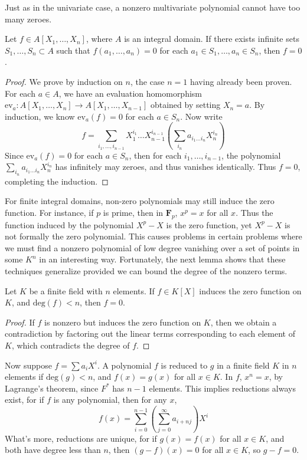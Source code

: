 Just as in the univariate case, a nonzero multivariate polynomial cannot have too many zeroes.

\begin{corollary}
    Let $f \in A[X_1, \dots, X_n]$, where $A$ is an integral domain. If there exists infinite sets $S_1, \dots, S_n \subset A$ such that $f(a_1, \dots, a_n) = 0$ for each $a_1 \in S_1, \dots, a_n \in S_n$, then $f = 0$.
\end{corollary}
\begin{proof}
    We prove by induction on $n$, the case $n = 1$ having already been proven. For each $a \in A$, we have an evaluation homomorphism $\text{ev}_a: A[X_1, \dots, X_n] \to A[X_1, \dots, X_{n-1}]$ obtained by setting $X_n = a$. By induction, we know $\text{ev}_a(f) = 0$ for each $a \in S_n$. Now write
    \[ f = \sum_{i_1, \dots, i_{n-1}} X_1^{i_1} \dots X_{n-1}^{i_{n-1}} \left( \sum_{i_n} a_{i_1 \dots i_n} X_n^{i_n} \right) \]
    Since $\text{ev}_a(f) = 0$ for each $a \in S_n$, then for each $i_1, \dots, i_{n-1}$, the polynomial $\sum_{i_n} a_{i_1 \dots i_n} X_n^{i_n}$ has infinitely may zeroes, and thus vanishes identically. Thus $f = 0$, completing the induction.
\end{proof}

For finite integral domains, non-zero polynomials may still induce the zero function. For instance, if $p$ is prime, then in $\mathbf{F}_p$, $x^p = x$ for all $x$. Thus the function induced by the polynomial $X^p - X$ is the zero function, yet $X^p - X$ is not formally the zero polynomial. This causes problems in certain problems where we must find a nonzero polynomial of low degree vanishing over a set of points in some $K^n$ in an interesting way. Fortunately, the next lemma shows that these techniques generalize provided we can bound the degree of the nonzero terms.

\begin{lemma}
    Let $K$ be a finite field with $n$ elements. If $f \in K[X]$ induces the zero function on $K$, and $\text{deg}(f) < n$, then $f = 0$.
\end{lemma}
\begin{proof}
	If $f$ is nonzero but induces the zero function on $K$, then we obtain a contradiction by factoring out the linear terms corresponding to each element of $K$, which contradicts the degree of $f$.
\end{proof}

Now suppose $f = \sum a_i X^i$. A polynomial $f$ is reduced to $g$ in a finite field $K$ in $n$ elements if $\text{deg}(g) < n$, and $f(x) = g(x)$ for all $x \in K$. In $f$, $x^n = x$, by Lagrange's theorem, since $F^*$ has $n-1$ elements. This implies reductions always exist, for if $f$ is any polynomial, then for any $x$,
%
\[ f(x) = \sum_{i = 0}^{n-1} \left( \sum_{j = 0}^\infty a_{i + nj} \right) X^i \]
%
What's more, reductions are unique, for if $g(x) = f(x)$ for all $x \in K$, and both have degree less than $n$, then $(g - f)(x) = 0$ for all $x \in K$, so $g - f = 0$.






